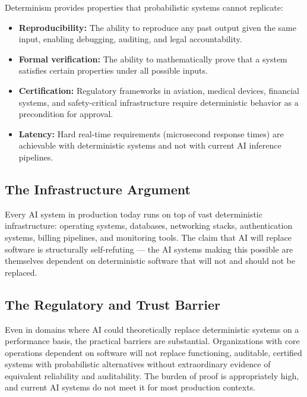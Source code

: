 \documentclass[12pt]{article}
\begin{document}
Determinism provides properties that probabilistic systems cannot replicate:

\begin{itemize}[noitemsep]
    \item \textbf{Reproducibility:} The ability to reproduce any past output given the same input, enabling debugging, auditing, and legal accountability.
    \item \textbf{Formal verification:} The ability to mathematically prove that a system satisfies certain properties under all possible inputs.
    \item \textbf{Certification:} Regulatory frameworks in aviation, medical devices, financial systems, and safety-critical infrastructure require deterministic behavior as a precondition for approval.
    \item \textbf{Latency:} Hard real-time requirements (microsecond response times) are achievable with deterministic systems and not with current AI inference pipelines.
\end{itemize}

\subsection{The Infrastructure Argument}

Every AI system in production today runs on top of vast deterministic infrastructure: operating systems, databases, networking stacks, authentication systems, billing pipelines, and monitoring tools. The claim that AI will replace software is structurally self-refuting --- the AI systems making this possible are themselves dependent on deterministic software that will not and should not be replaced.

\subsection{The Regulatory and Trust Barrier}

Even in domains where AI could theoretically replace deterministic systems on a performance basis, the practical barriers are substantial. Organizations with core operations dependent on software will not replace functioning, auditable, certified systems with probabilistic alternatives without extraordinary evidence of equivalent reliability and auditability. The burden of proof is appropriately high, and current AI systems do not meet it for most production contexts.

\end{document}
